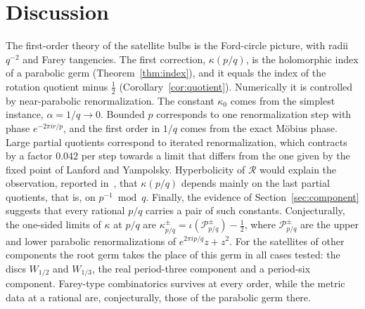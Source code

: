 \documentclass[11pt]{amsart}
\theoremstyle{definition}
\theoremstyle{remark}
\begin{document}
\section{Discussion}\label{sec:discussion}

The first-order theory of the satellite bulbs is the Ford-circle picture, with radii $q^{-2}$ and Farey tangencies. The first correction, $\kappa(p/q)$, is the holomorphic index of a parabolic germ (Theorem~\ref{thm:index}), and it equals the index of the rotation quotient minus $\frac12$ (Corollary~\ref{cor:quotient}). Numerically it is controlled by near-parabolic renormalization. The constant $\kappa_0$ comes from the simplest instance, $\alpha=1/q\to0$. Bounded $p$ corresponds to one renormalization step with phase $e^{-2\pi ir/p}$, and the first order in $1/q$ comes from the exact M\"obius phase. Large partial quotients correspond to iterated renormalization, which contracts by a factor $0.042$ per step towards a limit that differs from the one given by the fixed point of Lanford and Yampolsky. Hyperbolicity of $\mathcal R$ would explain the observation, reported in~\cite{repo}, that $\kappa(p/q)$ depends mainly on the last partial quotients, that is, on $p^{-1}\bmod q$. Finally, the evidence of Section~\ref{sec:component} suggests that every rational $p/q$ carries a pair of such constants. Conjecturally, the one-sided limits of $\kappa$ at $p/q$ are $\kappa^\pm_{p/q}=\iota(\mathcal P^\pm_{p/q})-\frac12$, where $\mathcal P^\pm_{p/q}$ are the upper and lower parabolic renormalizations of $e^{2\pi ip/q}z+z^2$. For the satellites of other components the root germ takes the place of this germ in all cases tested: the discs $W_{1/2}$ and $W_{1/3}$, the real period-three component and a period-six component. Farey-type combinatorics survives at every order, while the metric data at a rational are, conjecturally, those of the parabolic germ there.
\end{document}
